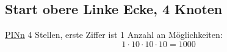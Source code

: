 \subsection{Start obere Linke Ecke, 4 Knoten}

\underline{PINn}
4 Stellen, erste Ziffer ist 1
Anzahl an Möglichkeiten: 
\begin{equation}
1 \cdot 10 \cdot 10 \cdot 10 = 1000
\end{equation}